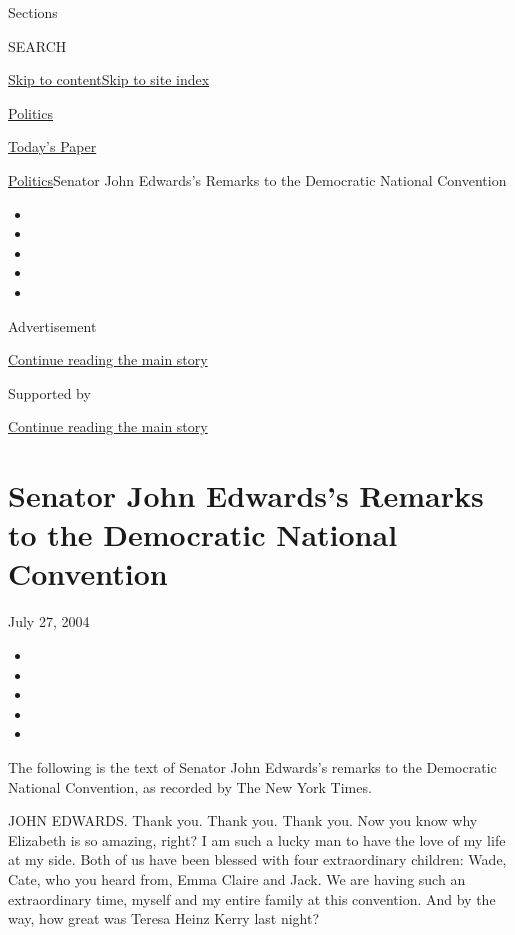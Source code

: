 Sections

SEARCH

\protect\hyperlink{site-content}{Skip to
content}\protect\hyperlink{site-index}{Skip to site index}

\href{https://www.nytimes3xbfgragh.onion/section/politics}{Politics}

\href{https://myaccount.nytimes3xbfgragh.onion/auth/login?response_type=cookie\&client_id=vi}{}

\href{https://www.nytimes3xbfgragh.onion/section/todayspaper}{Today's
Paper}

\href{/section/politics}{Politics}\textbar{}Senator John Edwards's
Remarks to the Democratic National Convention

\begin{itemize}
\item
\item
\item
\item
\item
\end{itemize}

Advertisement

\protect\hyperlink{after-top}{Continue reading the main story}

Supported by

\protect\hyperlink{after-sponsor}{Continue reading the main story}

\hypertarget{senator-john-edwardss-remarks-to-the-democratic-national-convention}{%
\section{Senator John Edwards's Remarks to the Democratic National
Convention}\label{senator-john-edwardss-remarks-to-the-democratic-national-convention}}

July 27, 2004

\begin{itemize}
\item
\item
\item
\item
\item
\end{itemize}

The following is the text of Senator John Edwards's remarks to the
Democratic National Convention, as recorded by The New York Times.

JOHN EDWARDS. Thank you. Thank you. Thank you. Now you know why
Elizabeth is so amazing, right? I am such a lucky man to have the love
of my life at my side. Both of us have been blessed with four
extraordinary children: Wade, Cate, who you heard from, Emma Claire and
Jack. We are having such an extraordinary time, myself and my entire
family at this convention. And by the way, how great was Teresa Heinz
Kerry last night?

